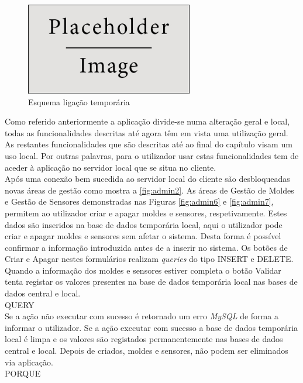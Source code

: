 \documentclass[11pt,twoside,a4paper]{report}
\begin{document}
\begin{figure}[H]
	\begin{center}
		\includegraphics[width=0.65\textwidth]{placeholder} %
		\caption{Esquema ligação temporária}
		\label{fig:admin3}
	\end{center}
\end{figure}
Como referido anteriormente a aplicação divide-se numa alteração geral e local, todas as funcionalidades descritas até agora têm em vista uma utilização geral. As restantes funcionalidades que são descritas até ao final do capítulo visam um uso local. Por outras palavras, para o utilizador usar estas funcionalidades tem de aceder à aplicação no servidor local que se situa no cliente.\\
Após uma conexão bem sucedida ao servidor local do cliente são desbloqueadas novas áreas de gestão como mostra a \autoref{fig:admin2}. As áreas de Gestão de Moldes e Gestão de Sensores demonstradas nas Figuras \ref{fig:admin6} e \ref{fig:admin7}, permitem ao utilizador criar e apagar moldes e sensores, respetivamente. Estes dados são inseridos na base de dados temporária local, aqui o utilizador pode criar e apagar moldes e sensores sem afetar o sistema. Desta forma é possível confirmar a informação introduzida antes de a inserir no sistema. Os botões de Criar e Apagar nestes formulários realizam \textit{queries} do tipo INSERT e DELETE. Quando a informação dos moldes e sensores estiver completa o botão Validar tenta registar os valores presentes na base de dados temporária local nas bases de dados central e local.\\
QUERY\\
Se a ação não executar com sucesso é retornado um erro \textit{MySQL} de forma a informar o utilizador. Se a ação executar com sucesso a base de dados temporária local é limpa e os valores são registados permanentemente nas bases de dados central e local. Depois de criados, moldes e sensores, não podem ser eliminados via aplicação.\\
PORQUE\\
\end{document}
